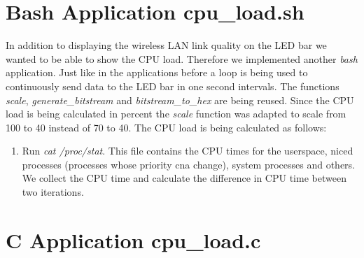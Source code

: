 \section{Bash Application cpu\_load.sh}

In addition to displaying the wireless LAN link quality on the LED bar we wanted to be able to show the CPU load. Therefore we implemented another \textit{bash} application.  Just like in the applications before a loop is being used to continuously send data to the LED bar in one second intervals. The functions \textit{scale}, \textit{generate\_bitstream} and \textit{bitstream\_to\_hex} are being reused. Since the CPU load is being calculated in percent the \textit{scale} function was adapted to scale from 100 to 40 instead of 70 to 40. The CPU load is being calculated as follows:

\begin{enumerate} 

\item Run \textit{cat /proc/stat}. This file contains the CPU times for the userspace, niced processes (processes whose priority cna change), system processes and others. We collect the CPU time and calculate the difference in CPU time between two iterations. 

\end{enumerate}




\section{C Application cpu\_load.c}
